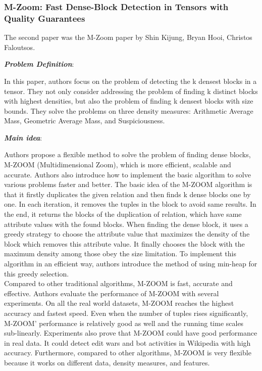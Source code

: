 \subsubsection{M-Zoom: Fast Dense-Block Detection in Tensors with Quality Guarantees}
The second paper was the M-Zoom paper by Shin Kijung, Bryan Hooi, Christos Faloutsos.\cite{shin2016m}
\begin{itemize*}
\item {\em \textbf{Problem Definition}}: 

In this paper, authors focus on the problem of detecting the k densest blocks in a tensor. They not only consider addressing the problem of finding k distinct blocks with highest densities, but also the problem of finding k densest blocks with size bounds. They solve the problems on three density measures: Arithmetic Average Mass, Geometric Average Mass, and Suspiciousness. \\ 


\item {\em \textbf{Main idea}}: 

Authors propose a flexible method to solve the problem of finding dense blocks, M-ZOOM (Multidimensional Zoom), which is more efficient, scalable and accurate. Authors also introduce how to implement the basic algorithm to solve various problems faster and better. The basic idea of the M-ZOOM algorithm is that it firstly duplicates the given relation and then finds k dense blocks one by one. In each iteration, it removes the tuples in the block to avoid same results. In the end, it returns the blocks of the duplication of relation, which have same attribute values with the found blocks. When finding the dense block, it uses a greedy strategy to choose the attribute value that maximizes the density of the block which removes this attribute value. It finally chooses the block with the maximum density among those obey the size limitation. To implement this algorithm in an efficient way, authors introduce the method of using min-heap for this greedy selection.  \\ 


Compared to other traditional algorithms, M-ZOOM is fast, accurate and effective. Authors evaluate the performance of M-ZOOM with several experiments. On all the real world datasets, M-ZOOM reaches the highest accuracy and fastest speed. Even when the number of tuples rises significantly, M-ZOOM’ performance is relatively good as well and the running time scales sub-linearly. Experiments also prove that M-ZOOM could have good performance in real data. It could detect edit wars and bot activities in Wikipedia with high accuracy. Furthermore, compared to other algorithms, M-ZOOM is very flexible because it works on different data, density measures, and features.  \\ 



\end{itemize*}
